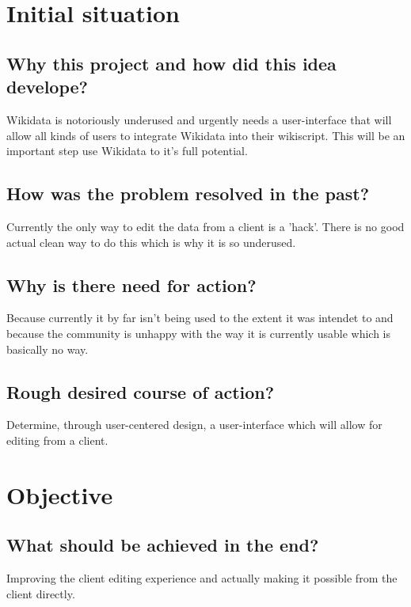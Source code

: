 \documentclass{article}
\date{1.11.2015}
\begin{document}
\section{Initial situation}

\subsection{Why this project and how did this idea develope?}

Wikidata is notoriously underused and urgently needs a user-interface that will allow all kinds of users to integrate Wikidata into their wikiscript. This will be an important step use Wikidata to it's full potential.

\subsection{How was the problem resolved in the past?}

Currently the only way to edit the data from a client is a 'hack'. There is no good actual clean way to do this which is why it is so underused. 

\subsection{Why is there need for action?}

Because currently it by far isn't being used to the extent it was intendet to and because the community is unhappy with the way it is currently usable which is basically no way.

\subsection{Rough desired course of action?}

Determine, through user-centered design, a user-interface which will allow for editing from a client. 


\section{Objective}

\subsection{What should be achieved in the end?}

Improving the client editing experience and actually making it possible from the client directly.
\end{document}
